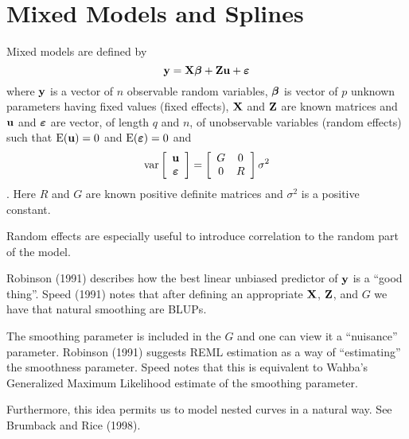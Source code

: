 \section{Mixed Models and Splines}

Mixed models are defined by 
\[
{\mathbf y} = {\mathbf X} \mbox{\boldmath $\beta$\unboldmath} + {\mathbf Z} {\mathbf u} + \mbox{\boldmath $\varepsilon$\unboldmath}
\]
where ${\mathbf y}$ is a vector of $n$ observable random variables, $\mbox{\boldmath $\beta$\unboldmath}$
is vector of $p$ unknown parameters having fixed values (fixed
effects), ${\mathbf X}$ and ${\mathbf Z}$ are known matrices and ${\mathbf u}$ and
$\mbox{\boldmath $\varepsilon$\unboldmath}$ are vector, of length $q$ and $n$, of unobservable variables
(random 
effects) such that $\mbox{E}({\mathbf u})=0$ and $\mbox{E}(\mbox{\boldmath $\varepsilon$\unboldmath})=0$ and 
\[
\mbox{var}\left[ \begin{array}{c} {\mathbf u} \\ \mbox{\boldmath $\varepsilon$\unboldmath} \end{array} \right] 
= 
\left[ \begin{array}{cc} G&0\\ 0&R \end{array} \right] \sigma^2
\].
Here $R$ and $G$ are known positive definite matrices and $\sigma^2$
is a positive constant.

Random effects are especially useful to introduce correlation to the
random part of the model.

Robinson (1991) describes how the best linear unbiased predictor of
${\mathbf y}$ is a ``good thing''. Speed (1991) notes that after defining an
appropriate ${\mathbf X}$, ${\mathbf Z}$, and $G$ we have that natural smoothing are
BLUPs.

The smoothing parameter is included in the $G$ and one can view it a
``nuisance'' parameter. Robinson (1991) suggests REML estimation
as a way of ``estimating'' the smoothness parameter. Speed notes that
this is equivalent to Wahba's Generalized Maximum Likelihood estimate
of the smoothing parameter. 

Furthermore, this idea permits us to model nested curves in a natural
way. See Brumback and Rice (1998).

